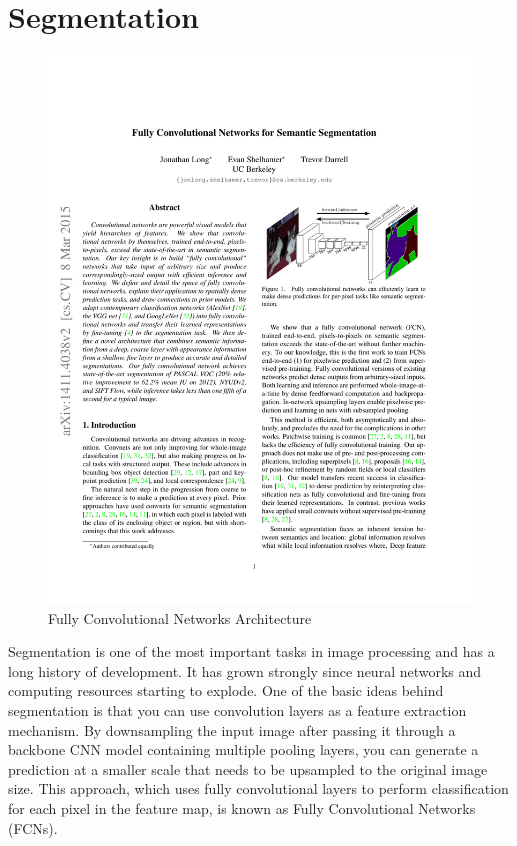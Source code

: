\section{Segmentation}
\label{sec:segmentation}

\begin{figure}[!h]
    \centering
    \includegraphics[width=\textwidth]{content/resources/new_images/related_works/fcn.pdf}
    \caption{Fully Convolutional Networks Architecture}
    \label{fig:fcn}
\end{figure}

Segmentation is one of the most important tasks in image processing and has a long history of development. It has grown strongly since neural networks and computing resources starting to explode. One of the basic ideas behind segmentation is that you can use convolution layers as a feature extraction mechanism. By downsampling the input image after passing it through a backbone CNN model containing multiple pooling layers, you can generate a prediction at a smaller scale that needs to be upsampled to the original image size. This approach, which uses fully convolutional layers to perform classification for each pixel in the feature map, is known as Fully Convolutional Networks (FCNs)\cite{FCN}.


